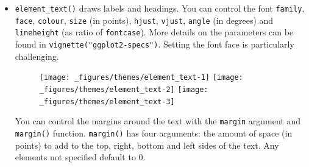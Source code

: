 \begin{itemize}
\item
  \texttt{element\_text()} draws labels and headings. You can control
  the font \texttt{family}, \texttt{face}, \texttt{colour},
  \texttt{size} (in points), \texttt{hjust}, \texttt{vjust},
  \texttt{angle} (in degrees) and \texttt{lineheight} (as ratio of
  \texttt{fontcase}). More details on the parameters can be found in
  \texttt{vignette("ggplot2-specs")}. Setting the font face is
  particularly challenging.  

\begin{Shaded}
\begin{Highlighting}[]
\StringTok{ }\StringTok{ }\NormalTok{(} \NormalTok{) +}\StringTok{ }\NormalTok{(}\NormalTok{) +}\StringTok{ }\NormalTok{(}\NormalTok{)}
\StringTok{ }\NormalTok{(} \NormalTok{(} \NormalTok{))}
\StringTok{ }\NormalTok{(} \NormalTok{(} \NormalTok{, } \NormalTok{))}
\StringTok{ }\NormalTok{(} \NormalTok{(} \NormalTok{))}
\end{Highlighting}
\end{Shaded}

  \begin{figure}[H]
    \texttt{[image: \_figures/themes/element\_text-1]}%
    \texttt{[image: \_figures/themes/element\_text-2]}%
    \texttt{[image: \_figures/themes/element\_text-3]}
  \end{figure}

  You can control the margins around the text with the \texttt{margin}
  argument and \texttt{margin()} function. \texttt{margin()} has four
  arguments: the amount of space (in points) to add to the top, right,
  bottom and left sides of the text. Any elements not specified default
  to 0.


\end{itemize}
